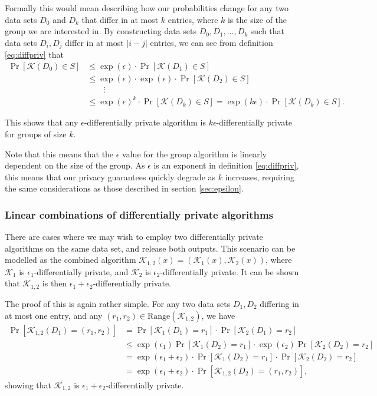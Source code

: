 \documentclass[12pt]{article}
\newcommand{\fancy}{\mathcal}
\begin{document}
Formally this would mean describing how our probabilities change for any two data sets $D_0$ and $D_k$ that differ in at most $k$ entries, where $k$ is the size of the group we are interested in. By constructing data sets $D_0, D_1, \dots, D_k$ such that data sets $D_i,D_j$ differ in at most $|i-j|$ entries, we can see from definition \ref{eq:diffpriv} that
\begin{align*}
    \Pr[\fancy{K}(D_0) \in S] &\leq \exp(\epsilon) \cdot \Pr[\fancy{K}(D_1) \in S] \\
        &\leq \exp(\epsilon) \cdot \exp(\epsilon) \cdot \Pr[\fancy{K}(D_2) \in S] \\
        &\qquad\vdots \\
        &\leq \exp(\epsilon)^k \cdot \Pr[\fancy{K}(D_k) \in S] = \exp(k\epsilon) \cdot \Pr[\fancy{K}(D_k) \in S].
\end{align*}

This shows that any $\epsilon$-differentially private algorithm is $k\epsilon$-differentially private for groups of size $k$. \bigskip

Note that this means that the $\epsilon$ value for the group algorithm is linearly dependent on the size of the group. As $\epsilon$ is an exponent in definition \ref{eq:diffpriv}, this means that our privacy guarantees quickly degrade as $k$ increases, requiring the same considerations as those described in section \ref{sec:epsilon}.

\subsubsection{Linear combinations of differentially private algorithms}

There are cases where we may wish to employ two differentially private algorithms on the same data set, and release both outputs. This scenario can be modelled as the combined algorithm $\fancy{K}_{1,2}(x)=\left(\fancy{K}_1(x), \fancy{K}_2(x)\right)$, where $\fancy{K}_1$ is $\epsilon_1$-differentially private, and $\fancy{K}_2$ is $\epsilon_2$-differentially private. It can be shown that $\fancy{K}_{1,2}$ is then $\epsilon_1+\epsilon_2$-differentially private.

The proof of this is again rather simple. For any two data sets $D_1,D_2$ differing in at most one entry, and any $(r_1,r_2) \in \text{Range}(\fancy{K}_{1,2})$, we have
\begin{align*}
    \Pr[\fancy{K}_{1,2}(D_1)=(r_1,r_2)] &= \Pr[\fancy{K}_1(D_1)=r_1]\cdot\Pr[\fancy{K}_2(D_1)=r_2] \\
        &\leq \exp(\epsilon_1) \Pr[\fancy{K}_1(D_2)=r_1] \cdot \exp(\epsilon_2) \Pr[\fancy{K}_2(D_2)=r_2] \\
        &= \exp(\epsilon_1 + \epsilon_2) \cdot \Pr[\fancy{K}_1(D_2)=r_1] \cdot \Pr[\fancy{K}_2(D_2)=r_2] \\
        &= \exp(\epsilon_1 + \epsilon_2) \cdot \Pr[\fancy{K}_{1,2}(D_2)=(r_1,r_2)],
\end{align*}
showing that $\fancy{K}_{1,2}$ is $\epsilon_1+\epsilon_2$-differentially private.
\end{document}
